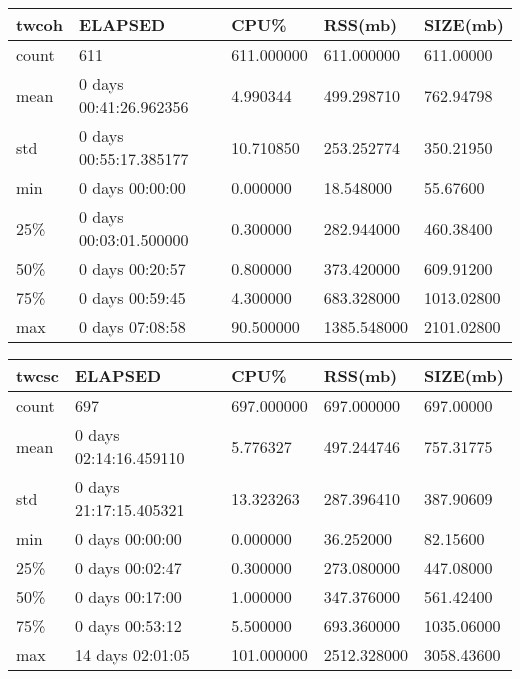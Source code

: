 \documentclass{article}
\begin{document}
\begin{table}[H]
\begin{tabular}{|l|l|l|l|l|}
\hline twcoh& ELAPSED&   CPU\%&  RSS(mb)&   SIZE(mb) \\
\hline count&    611& 611.000000&  611.000000&  611.00000 \\
\hline mean&  0 days 00:41:26.962356&  4.990344&  499.298710&  762.94798 \\
\hline std&  0 days 00:55:17.385177&  10.710850&  253.252774&  350.21950 \\
\hline min&   0 days 00:00:00&  0.000000&  18.548000&  55.67600 \\
\hline 25\%&  0 days 00:03:01.500000&  0.300000&  282.944000&  460.38400 \\
\hline 50\%&   0 days 00:20:57&  0.800000&  373.420000&  609.91200 \\
\hline 75\%&   0 days 00:59:45&  4.300000&  683.328000& 1013.02800 \\
\hline max&   0 days 07:08:58&  90.500000& 1385.548000& 2101.02800 \\
\hline 
\end{tabular}
\label{TABLE-SessionSizetwcoh}
\end{table}

\begin{table}[H]
\begin{tabular}{|l|l|l|l|l|}
\hline twcsc& ELAPSED&   CPU\%&  RSS(mb)&   SIZE(mb) \\
\hline count&    697& 697.000000&  697.000000&  697.00000 \\
\hline mean&  0 days 02:14:16.459110&  5.776327&  497.244746&  757.31775 \\
\hline std&  0 days 21:17:15.405321&  13.323263&  287.396410&  387.90609 \\
\hline min&   0 days 00:00:00&  0.000000&  36.252000&  82.15600 \\
\hline 25\%&   0 days 00:02:47&  0.300000&  273.080000&  447.08000 \\
\hline 50\%&   0 days 00:17:00&  1.000000&  347.376000&  561.42400 \\
\hline 75\%&   0 days 00:53:12&  5.500000&  693.360000& 1035.06000 \\
\hline max&  14 days 02:01:05& 101.000000& 2512.328000& 3058.43600 \\
\hline 
\end{tabular}
\label{TABLE-SessionSizetwcsc}
\end{table}
\end{document}
